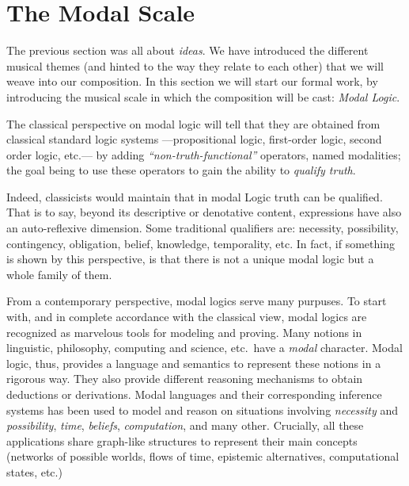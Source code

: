 
\section{The Modal Scale}


The previous section was all about \emph{ideas}.  We have introduced
the different musical themes (and hinted to the way they relate to 
each other) that we will weave into our composition.  In this section 
we will start our formal work, by introducing the musical scale in 
which the composition will be cast: \emph{Modal Logic}.

The classical perspective on modal logic will tell that they are obtained 
from classical standard logic systems
---propositional logic, first-order logic, second order logic, etc.--- by
adding \emph{``non-truth-functional''}
operators, named modalities; the goal being to use these operators 
to gain the ability to \emph{qualify truth}.

Indeed, classicists would maintain that in modal Logic truth can be qualified. 
That is to say, beyond its descriptive or denotative content, expressions have 
also an auto-reflexive dimension. 
Some traditional qualifiers are: necessity, possibility, 
contingency, obligation, belief, knowledge, temporality, etc. In fact, 
if something is shown by this perspective, is that there
is not a unique modal logic but a whole family of them.

From a contemporary perspective, modal logics serve many purpuses.
To start with, and in complete accordance with the classical view, 
modal logics are recognized as marvelous tools for modeling and proving. 
Many notions in linguistic, philosophy, computing and science, etc.\ have a 
\emph{modal} character. Modal logic, thus,
provides a language and semantics to represent these notions in a rigorous
way. They also provide different reasoning mechanisms to obtain deductions or
derivations. Modal languages and their corresponding inference systems has been 
used to model and reason on situations involving \emph{necessity}
and \emph{possibility}, \emph{time}, \emph{beliefs}, \emph{computation}, and
many other. Crucially, all these applications share graph-like structures to represent
their main concepts (networks of possible worlds, flows of time, epistemic
alternatives, computational states, etc.)

